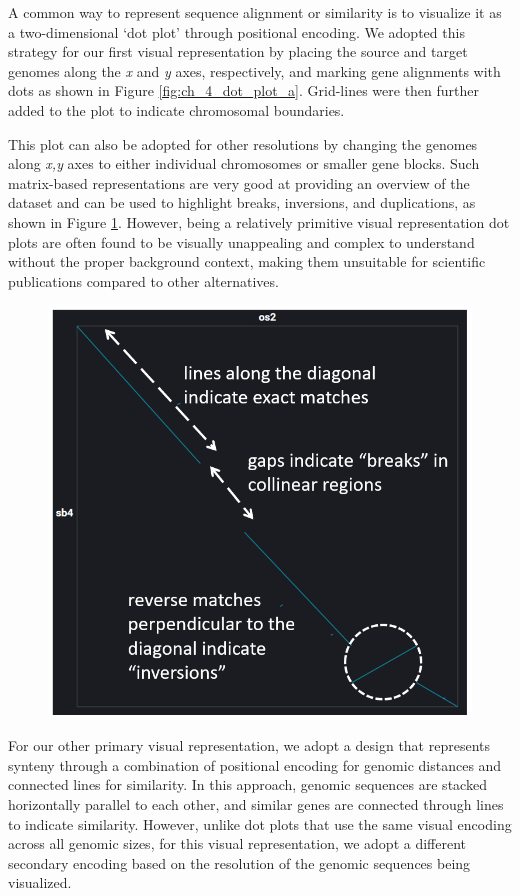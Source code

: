 A common way to represent sequence alignment or similarity is to visualize it as a two-dimensional `dot plot' \cite{SONNHAMMER1995GC1,Cabanettes2018} through positional encoding. We adopted this strategy for our first visual representation by placing the source and target genomes along the \textit{x} and \textit{y} axes, respectively, and marking gene alignments with dots as shown in Figure \ref{fig:ch_4_dot_plot_a}. Grid-lines were then further added to the plot to indicate chromosomal boundaries.



This plot can also be adopted for other resolutions by changing the genomes along \textit{x,y} axes to either individual chromosomes or smaller gene blocks. Such matrix-based representations are very good at providing an overview of the dataset and can be used to highlight breaks, inversions, and duplications, as shown in Figure \ref{fig:ch_4_dot_plot_b}. However, being a relatively primitive visual representation dot plots are often found to be visually unappealing and complex to understand without the proper background context, making them unsuitable for scientific publications compared to other alternatives.


\begin{figure}
  \centering
  \includegraphics[width=.475\linewidth]{images/ch_4_dot_plot_b.PNG}
  \label{fig:ch_4_dot_plot_b}
\end{figure}


For our other primary visual representation, we adopt a design that represents synteny through a combination of positional encoding for genomic distances and connected lines for similarity. In this approach, genomic sequences are stacked horizontally parallel to each other, and similar genes are connected through lines to indicate similarity. However, unlike dot plots that use the same visual encoding across all genomic sizes, for this visual representation, we adopt a different secondary encoding based on the resolution of the genomic sequences being visualized. 

